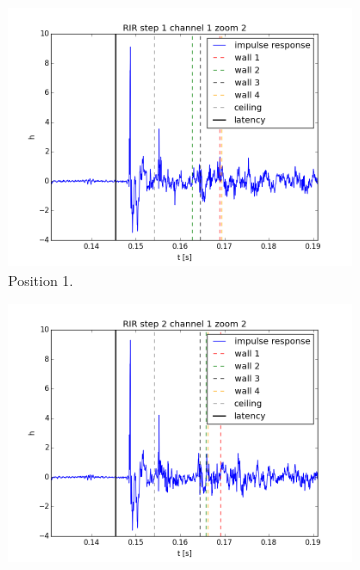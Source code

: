 \begin{figure}
    \centering
    \begin{subfigure}{0.49\linewidth}
        \centering
        \includegraphics[width=\linewidth]{files/1_1_filt_zoom2.png}
        \caption{Position 1.}
        \label{fig:rir_1}
    \end{subfigure}
    \begin{subfigure}{0.49\linewidth}
        \centering
        \includegraphics[width=\linewidth]{files/2_1_filt_zoom2.png}

\end{subfigure}
\end{figure}
